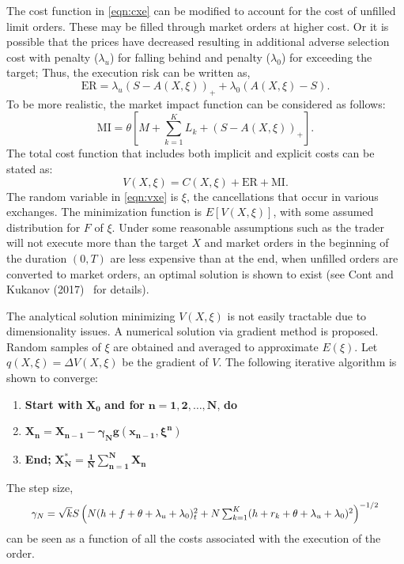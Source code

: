 The cost function in \eqref{eqn:cxe} can be modified to account for the cost of unfilled limit orders. These may be filled through market orders at higher cost. Or it is possible that the prices have decreased resulting in additional adverse selection cost with penalty ($\lambda_u$) for falling behind and penalty ($\lambda_0$) for exceeding the target; Thus, the execution risk can be written as,
	\begin{equation}\label{eqn:er}
	\text{ER}= \lambda_u (S-A(X,\xi))_+ + \lambda_0 (A(X,\xi)-S).
	\end{equation}
To be more realistic, the market impact function can be considered as follows:
	\begin{equation}\label{eqn:mi}
	\text{MI}= \theta \left[ M + \sum_{k=1}^K L_k + (S-A(X,\xi))_+ \right].
	\end{equation}
The total cost function that includes both implicit and explicit costs can be stated as:
	\begin{equation}\label{eqn:vxe}
	V(X,\xi)= C(X,\xi) + \text{ER} + \text{MI}.
	\end{equation}
The random variable in \eqref{eqn:vxe} is $\xi$, the cancellations that occur in various exchanges. The minimization function is $E[V(X,\xi)]$, with some assumed distribution for $F$ of $\xi$. Under some reasonable assumptions such as the trader will not execute more than the target $X$ and market orders in the beginning of the duration $(0,T)$ are less expensive than at the end, when unfilled orders are converted to market orders, an optimal solution is shown to exist (see Cont and Kukanov (2017)~\cite{contk} for details).


The analytical solution minimizing $V(X,\xi)$ is not easily tractable due to dimensionality issues. A numerical solution via gradient method is proposed. Random samples of $\xi$ are obtained and averaged to approximate $E(\xi)$. Let $q(X,\xi)= \Delta V(X,\xi)$ be the gradient of $V$. The following iterative algorithm is shown to converge:
	\begin{enumerate}[--]
	\item \textbf{Start with }$\mathbf{X_0}$\textbf{ and for }$\mathbf{n=1,2,\ldots,N}$,\textbf{ do}
	\item $\mathbf{X_n=X_{n-1} - \gamma_N g(x_{n-1}, \xi^n)}$
	\item \textbf{End; }$\mathbf{X_N^* = \frac{1}{N} \sum_{n=1}^N X_n}$
	\end{enumerate}
The step size, 
	\begin{equation} \label{eqn:7gammaN}
	\scalebox{0.93}{$\gamma_N = \sqrt{k} S \left( N(h+f+\theta+\lambda_u +\lambda_0)^2 _ t + N \sum_{k=1}^K (h+r_k+\theta+\lambda_u+\lambda_0)^2 \right)^{-1/2}$}
	\end{equation}
can be seen as a function of all the costs associated with the execution of the order.


